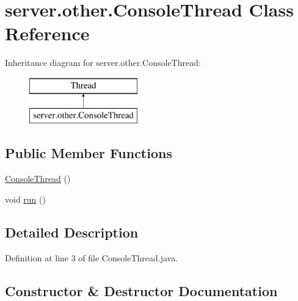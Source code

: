 \hypertarget{classserver_1_1other_1_1_console_thread}{}\section{server.\+other.\+Console\+Thread Class Reference}
\label{classserver_1_1other_1_1_console_thread}
Inheritance diagram for server.\+other.\+Console\+Thread\+:\begin{figure}[H]
\begin{center}
\leavevmode
\includegraphics[height=2.000000cm]{classserver_1_1other_1_1_console_thread}
\end{center}
\end{figure}
\subsection*{Public Member Functions}
\begin{DoxyCompactItemize}
\item 
\hyperlink{classserver_1_1other_1_1_console_thread_a2204d019f20ec2cc5f8dff883b1fcc42}{Console\+Thread} ()
\item 
void \hyperlink{classserver_1_1other_1_1_console_thread_aa0b14ad43aa42913422a32fdbf08551a}{run} ()
\end{DoxyCompactItemize}


\subsection{Detailed Description}


Definition at line 3 of file Console\+Thread.\+java.



\subsection{Constructor \& Destructor Documentation}
\hypertarget{classserver_1_1other_1_1_console_thread_a2204d019f20ec2cc5f8dff883b1fcc42}{}\label{classserver_1_1other_1_1_console_thread_a2204d019f20ec2cc5f8dff883b1fcc42} 
